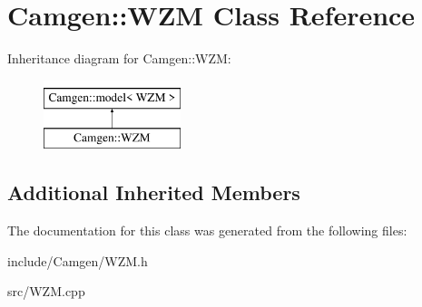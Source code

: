 \hypertarget{a00579}{\section{Camgen\-:\-:W\-Z\-M Class Reference}
\label{a00579}
}
Inheritance diagram for Camgen\-:\-:W\-Z\-M\-:\begin{figure}[H]
\begin{center}
\leavevmode
\includegraphics[height=2.000000cm]{a00579}
\end{center}
\end{figure}
\subsection*{Additional Inherited Members}


The documentation for this class was generated from the following files\-:\begin{DoxyCompactItemize}
\item 
include/\-Camgen/W\-Z\-M.\-h\item 
src/W\-Z\-M.\-cpp\end{DoxyCompactItemize}
